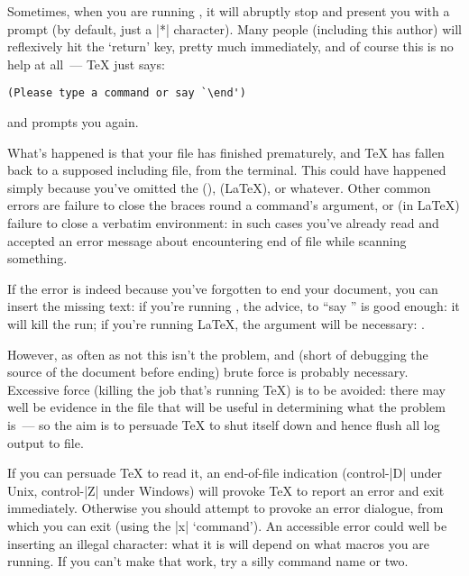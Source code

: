 {

Sometimes, when you are running \AllTeX{}, it will abruptly stop and
present you with a prompt (by default, just a |*| character).  Many
people (including this author) will reflexively hit the `return'
key, pretty much immediately, and of course this is no help at all~---
\TeX{} just says:
\begin{verbatim}
(Please type a command or say `\end')
\end{verbatim}
and prompts you again.

What's happened is that your \AllTeX{} file has finished prematurely,
and \TeX{} has fallen back to a supposed including file, from the
terminal.  This could have happened simply because you've omitted
the  (\plaintex{}),  (\LaTeX{}), or
whatever.  Other common errors are failure to close the braces round a
command's argument, or (in \LaTeX{}) failure to close a verbatim
environment: in such cases you've already read and accepted an
error message about encountering end of file while scanning something.

If the error is indeed because you've forgotten to end your document,
you can insert the missing text: if you're running \plaintex{}, the
advice, to ``say '' is good enough: it will kill the run; if
you're running \LaTeX{}, the argument will be necessary:
.  

However, as often as not this isn't the problem, and (short of
debugging the source of the document before ending) brute force is
probably necessary.  Excessive force (killing the job that's
running \TeX{}) is to be avoided: there may well be evidence in the
 file that will be useful in determining what the
problem is~--- so the aim is to persuade \TeX{} to shut itself down
and hence flush all log output to file.

If you can persuade \TeX{} to read it, an end-of-file indication
(control-|D| under Unix, control-|Z| under Windows) will provoke
\TeX{} to report an error and exit immediately.  Otherwise you should
attempt to provoke an error dialogue, from which you can exit (using
the |x| `command').  An accessible error could well be inserting an
illegal character: what it is will depend on what macros you are
running.  If you can't make that work, try a silly command name or
two.


}
